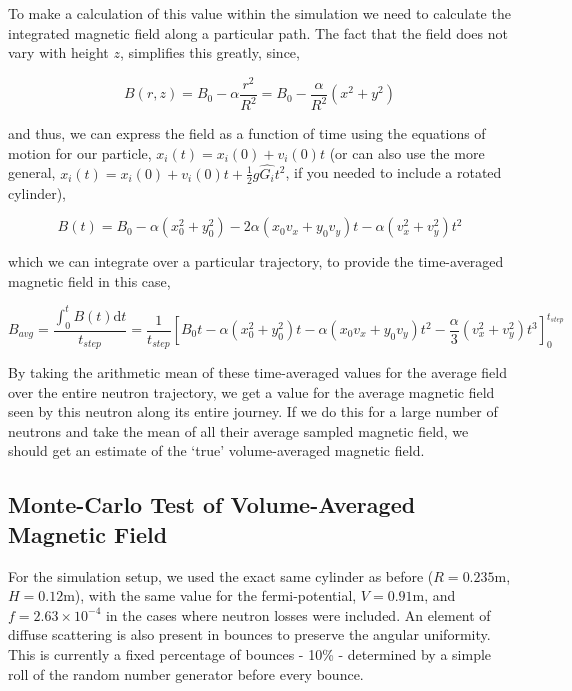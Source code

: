 \documentclass[11pt,a4paper,oneside]{article}
\begin{document}
To make a calculation of this value within the simulation we need to calculate the integrated magnetic field along a particular path. The fact that the field does not vary with height $z$, simplifies this greatly, since, 

\begin{equation}
B(r,z) = B_{0} - \alpha \frac{r^{2}}{R^{2}} = B_{0} - \frac{\alpha}{R^{2}}(x^{2} + y^{2})
\label{eqn:magfieldcomponents}
\end{equation}

and thus, we can express the field as a function of time using the equations of motion for our particle, $x_{i}(t) = x_{i}(0) + v_{i}(0)t$ (or can also use the more general, $x_{i}(t) = x_{i}(0) + v_{i}(0)t + \frac{1}{2}g\hat{G_{i}}t^{2}$, if you needed to include a rotated cylinder),

\begin{equation}
B(t) = B_{0} - \alpha(x_{0}^{2} + y_{0}^{2}) - 2\alpha(x_{0}v_{x} + y_{0}v_{y})t - \alpha(v_{x}^{2} + v_{y}^{2})t^{2}
\label{eqn:magfieldparametric}
\end{equation}

which we can integrate over a particular trajectory, to provide the time-averaged magnetic field in this case,

\begin{equation}
B_{avg} = \frac{\int_{0}^{t} B(t) \mathrm{d}t}{t_{step}} = \frac{1}{t_{step}}\left[ B_{0}t - \alpha(x_{0}^{2} + y_{0}^{2})t - \alpha(x_{0}v_{x} + y_{0}v_{y})t^{2} - \frac{\alpha}{3}(v_{x}^{2} + v_{y}^{2})t^{3} \right]^{t_{step}}_{0}
\label{eqn:magfieldparametric}
\end{equation}

By taking the arithmetic mean of these time-averaged values for the average field over the entire neutron trajectory, we get a value for the average magnetic field seen by this neutron along its entire journey. If we do this for a large number of neutrons and take the mean of all their average sampled magnetic field, we should get an estimate of the `true' volume-averaged magnetic field. 

\subsection{Monte-Carlo Test of Volume-Averaged Magnetic Field}

For the simulation setup, we used the exact same cylinder as before ($R = 0.235$m, $H = 0.12$m), with the same value for the fermi-potential, $V = 0.91$m, and $f = 2.63\times10^{-4}$ in the cases where neutron losses were included. An element of diffuse scattering is also present in bounces to preserve the angular uniformity. This is currently a fixed percentage of bounces - 10\% - determined by a simple roll of the random number generator before every bounce. 
\end{document}
